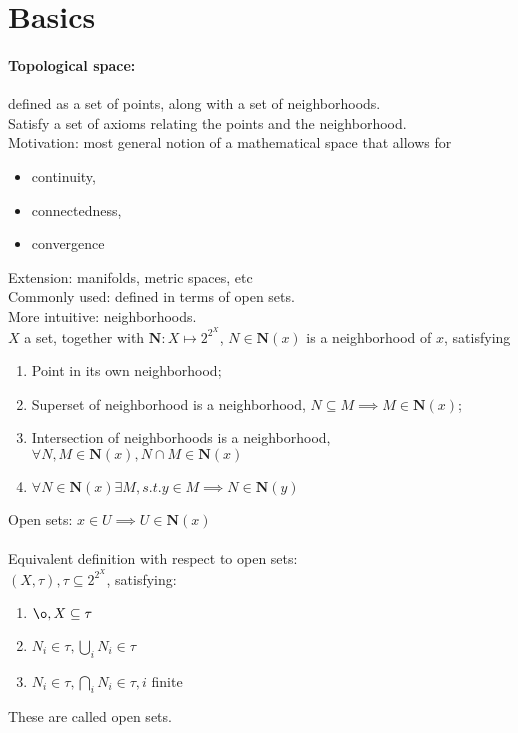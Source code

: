 \documentclass[10pt,a4paper]{article}
\begin{document}
\section{Basics}
\paragraph{Topological space:} defined as a set of points, along with a set of neighborhoods.\\
Satisfy a set of axioms relating the points and the neighborhood.\\
Motivation: most general notion of a mathematical space that allows for \\
\begin{itemize}
	\item continuity, 
	\item connectedness,
	\item convergence
\end{itemize}
Extension: manifolds, metric spaces, etc\\
Commonly used: defined in terms of open sets.\\
More intuitive: neighborhoods.\\

$X$ a set, together with $\mathbf{N}:X\mapsto 2^{2^{X}}$, $N\in\mathbf{N}(x)$ is a neighborhood of $x$, satisfying
\begin{enumerate}
	\item Point in its own neighborhood;
	\item Superset of neighborhood is a neighborhood, $N\subseteq M\implies M\in\mathbf{N}(x)$;
	\item Intersection of neighborhoods is a neighborhood, $\forall N,M\in\mathbf{N}(x),N\cap M\in				  \mathbf{N}(x)$
	\item $\forall N\in\mathbf{N}(x)\exists M,s.t. y\in M\implies N\in\mathbf{N}(y)$
\end{enumerate}

Open sets: $x\in U\implies U\in\mathbf{N}(x)$\\
\\
Equivalent definition with respect to open sets:\\
$(X,\tau),\tau\subseteq 2^{2^{X}}$, satisfying:
\begin{enumerate}
	\item $\o,X\subseteq \tau$
	\item $N_{i}\in\tau,\bigcup_{i}N_{i}\in\tau$
	\item $N_{i}\in\tau,\bigcap_{i}N_{i}\in\tau,i$ finite
\end{enumerate}
These are called open sets.\\
\\
\end{document}
